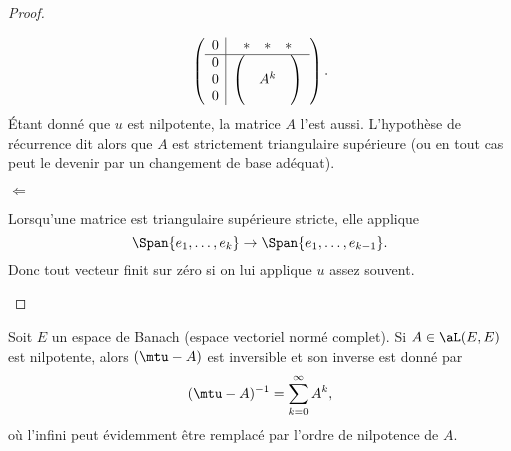 \begin{proof}
\begin{subproof}
\begin{equation}
               \begin{pmatrix}
                       \begin{array}[]{c|c}
                           0&\begin{matrix} 
                               * &   *    &   *    
                           \end{matrix}\\
                           \hline
                           \begin{matrix}
                               0 \\ 
                               0 \\ 
                               0 
                           \end{matrix}&
                           \begin{pmatrix}
                                &       &       \\
                                &   A^k    &       \\
                                &       &   
                           \end{pmatrix}
                       \end{array}
               \end{pmatrix}.
           \end{equation}
           Étant donné que \( u\) est nilpotente, la matrice \( A\) l'est aussi. L'hypothèse de récurrence dit alors que \( A\) est strictement triangulaire supérieure (ou en tout cas peut le devenir par un changement de base adéquat).

       \item[\( \Leftarrow\)]

            Lorsqu'une matrice est triangulaire supérieure stricte, elle applique
            \begin{equation}
                \Span\{ e_1,\ldots, e_k \}\to\Span\{ e_1,\ldots, e_{k-1} \}.
            \end{equation}
            Donc tout vecteur finit sur zéro si on lui applique \( u\) assez souvent.
    \end{subproof}
\end{proof}

\begin{proposition}     \label{PROPooWTFWooXHlmhp}
    Soit \( E\) un espace de Banach (espace vectoriel normé complet). Si \( A\in\aL(E,E)\) est nilpotente, alors \( (\mtu-A)\) est inversible et son inverse est donné par
    \begin{equation}
        (\mtu-A)^{-1}=\sum_{k=0}^{\infty}A^k,
    \end{equation}
    où l'infini peut évidemment être remplacé par l'ordre de nilpotence de \( A\).
\end{proposition}

